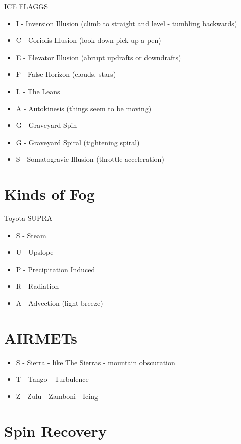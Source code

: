 ICE FLAGGS

\begin{itemize}
\item I - Inversion Illusion (climb to straight and level - tumbling backwards)
\item C - Coriolis Illusion (look down pick up a pen)
\item E - Elevator Illusion (abrupt updrafts or downdrafts)
\item F - False Horizon (clouds, stars)
\item L - The Leans 
\item A - Autokinesis (things seem to be moving)
\item G - Graveyard Spin
\item G - Graveyard Spiral (tightening spiral)
\item S - Somatogravic Illusion (throttle acceleration)
\end{itemize}

\section{Kinds of Fog}

Toyota SUPRA

\begin{itemize}
    \item S - Steam
    \item U - Upslope
    \item P - Precipitation Induced
    \item R - Radiation
    \item A - Advection (light breeze)
\end{itemize}

\section{AIRMETs}

\begin{itemize}
    \item S - Sierra - like The Sierras - mountain obscuration
    \item T - Tango - Turbulence
    \item Z - Zulu - Zamboni - Icing
\end{itemize}

\section{Spin Recovery}

